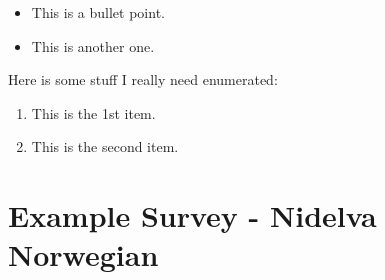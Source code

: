 \begin{itemize}
	\item This is a bullet point.
    \item This is another one.
\end{itemize}

Here is some stuff I really need enumerated:

\begin{enumerate}
	\item This is the 1st item.
    \item This is the second item.
\end{enumerate}

\section{Example Survey - Nidelva Norwegian }